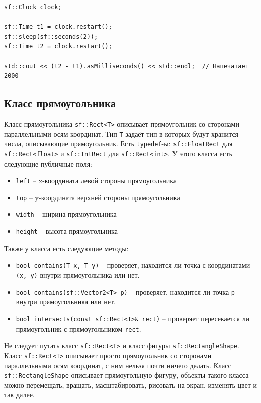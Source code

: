 \documentclass{article}
\begin{document}
\begin{lstlisting}
sf::Clock clock;

sf::Time t1 = clock.restart();
sf::sleep(sf::seconds(2));
sf::Time t2 = clock.restart();
    
std::cout << (t2 - t1).asMilliseconds() << std::endl;  // Напечатает 2000
\end{lstlisting}


\newpage



\subsection*{Класс прямоугольника}
Класс прямоугольника \texttt{sf::Rect<T>} описывает прямоугольник со сторонами параллельными осям координат.
Тип \texttt{T} задаёт тип в которых будут хранится числа, описывающие прямоугольник. Есть \texttt{typedef}-ы: \texttt{sf::FloatRect} для \texttt{sf::Rect<float>} и \texttt{sf::IntRect} для \texttt{sf::Rect<int>}.
У этого класса есть следующие публичные поля:
\begin{itemize}
\item \texttt{left} -- x-координата левой стороны прямоугольника 
\item \texttt{top} -- y-координата верхней стороны прямоугольника 
\item \texttt{width} -- ширина прямоугольника
\item \texttt{height} -- высота прямоугольника
\end{itemize}

Также у класса есть следующие методы:
\begin{itemize}
\item \texttt{bool contains(T x, T y)} -- проверяет, находится ли точка с координатами \texttt{(x, y)} внутри прямоугольника или нет.
\item \texttt{bool contains(sf::Vector2<T> p)}  -- проверяет, находится ли точка \texttt{p} внутри прямоугольника или нет.
\item \texttt{bool intersects(const sf::Rect<T>\& rect)} -- проверяет пересекается ли прямоугольник с прямоугольником \texttt{rect}.
\end{itemize}

Не следует путать класс \texttt{sf::Rect<T>} и класс фигуры \texttt{sf::RectangleShape}.
Класс \texttt{sf::Rect<T>} описывает просто прямоугольник со сторонами параллельными осям координат, с ним нельзя почти ничего делать. Класс \texttt{sf::RectangleShape} описывает прямоугольную фигуру, объекты такого класса можно перемещать, вращать, масштабировать, рисовать на экран, изменять цвет и так далее.
\end{document}
